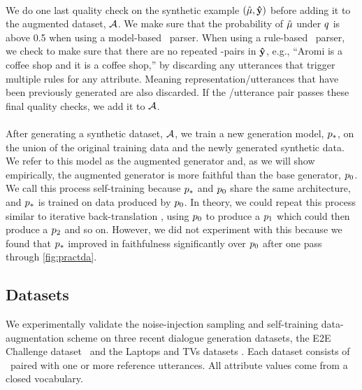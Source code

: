 \paragraph{}
We do one last quality check on the synthetic example
$(\hat{\mu},\boldsymbol{\hat{\mathbf{y}}})$ before adding it to the augmented dataset,
${\mathcal{A}}$. We make sure that the probability of $\hat{\mu}$ under $q$
is above 0.5 when using a model-based \meaningrepresentation~parser. When using
a rule-based \meaningrepresentation~parser, we check to make sure that there
are no repeated \attributevalue-pairs in $\boldsymbol{\hat{\mathbf{y}}}$, e.g., ``Aromi is a
coffee shop and it is a coffee shop,'' by discarding any utterances that
trigger multiple rules for any attribute.  Meaning representation/utterances
that have been previously generated are also discarded. If the
\meaningrepresentation/utterance pair passes these final quality checks, we add
it to ${\mathcal{A}}$.

\paragraph{} After generating a synthetic dataset, ${\mathcal{A}}$, we train a new
generation model, $p_*$, on the union of the original training data and the
newly generated synthetic data. We refer to this model as the augmented
generator and, as we will show empirically, the augmented generator is more
faithful than the base generator, $p_0$.  We call this process self-training
because $p_*$ and $p_0$ share the same architecture, and $p_*$ is
trained on data produced by $p_0$. In theory, we could repeat this process
similar to iterative back-translation \citep{hoang2018}, using $p_0$ to
produce a $p_1$ which could then produce a $p_2$ and so on. However, we
did not experiment with this because we found that $p_*$ improved in
faithfulness significantly over $p_0$ after one pass through
\autoref{fig:practda}.

\subsection{Datasets}



We experimentally validate the noise-injection sampling and self-training
data-augmentation scheme on three recent dialogue generation datasets, the E2E
Challenge dataset~\citep{novikova2017} and the Laptops and TVs datasets
\citep{wen2016}.  Each dataset consists of \meaningrepresentations~paired with
one or more reference utterances.  All attribute values come from a closed
vocabulary.

